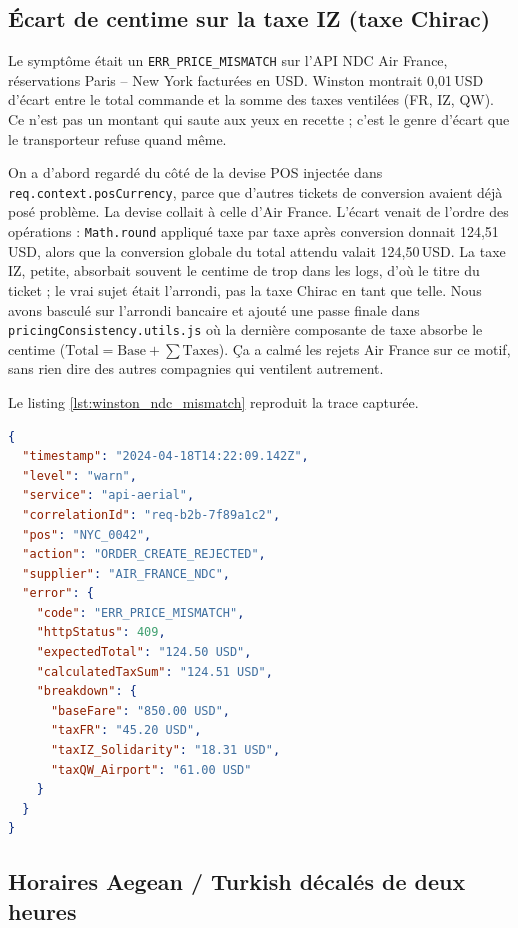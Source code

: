 \subsection{Écart de centime sur la taxe IZ (taxe Chirac)}

Le symptôme était un \texttt{ERR\_PRICE\_MISMATCH} sur l'API NDC Air France, réservations Paris -- New York facturées en USD. Winston montrait 0,01\,USD d'écart entre le total commande et la somme des taxes ventilées (FR, IZ, QW). Ce n'est pas un montant qui saute aux yeux en recette ; c'est le genre d'écart que le transporteur refuse quand même.

On a d'abord regardé du côté de la devise POS injectée dans \texttt{req.context.posCurrency}, parce que d'autres tickets de conversion avaient déjà posé problème. La devise collait à celle d'Air France. L'écart venait de l'ordre des opérations : \texttt{Math.round} appliqué taxe par taxe après conversion donnait 124,51\,USD, alors que la conversion globale du total attendu valait 124,50\,USD. La taxe IZ, petite, absorbait souvent le centime de trop dans les logs, d'où le titre du ticket ; le vrai sujet était l'arrondi, pas la taxe Chirac en tant que telle. Nous avons basculé sur l'arrondi bancaire et ajouté une passe finale dans \texttt{pricingConsistency.utils.js} où la dernière composante de taxe absorbe le centime ($\text{Total} = \text{Base} + \sum \text{Taxes}$). Ça a calmé les rejets Air France sur ce motif, sans rien dire des autres compagnies qui ventilent autrement.

Le listing \ref{lst:winston_ndc_mismatch} reproduit la trace capturée.

\begin{lstlisting}[language=json, caption={Log Winston --- rejet NDC écart de taxes}, label={lst:winston_ndc_mismatch}]
{
  "timestamp": "2024-04-18T14:22:09.142Z",
  "level": "warn",
  "service": "api-aerial",
  "correlationId": "req-b2b-7f89a1c2",
  "pos": "NYC_0042",
  "action": "ORDER_CREATE_REJECTED",
  "supplier": "AIR_FRANCE_NDC",
  "error": {
    "code": "ERR_PRICE_MISMATCH",
    "httpStatus": 409,
    "expectedTotal": "124.50 USD",
    "calculatedTaxSum": "124.51 USD",
    "breakdown": {
      "baseFare": "850.00 USD",
      "taxFR": "45.20 USD",
      "taxIZ_Solidarity": "18.31 USD",
      "taxQW_Airport": "61.00 USD"
    }
  }
}
\end{lstlisting}

\subsection{Horaires Aegean / Turkish décalés de deux heures}

